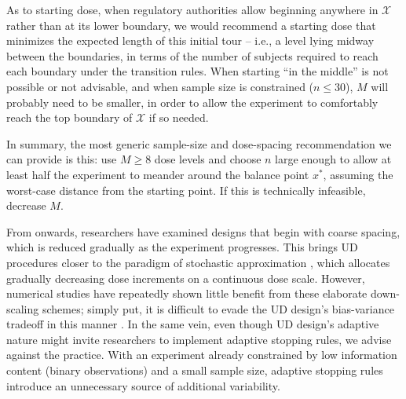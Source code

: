 As to starting dose, when regulatory authorities allow beginning anywhere in $\mathcal{X}$ rather than at its lower boundary, we would recommend a starting dose that minimizes the expected length of this initial tour -- i.e., a level lying midway between the boundaries, in terms of the number of subjects required to reach each boundary under the transition rules. When starting ``in the middle'' is not possible or not advisable, and when sample size is constrained ($n\leq 30$), $M$ will probably need to be smaller, in order to allow the experiment to comfortably reach the top boundary of $\mathcal{X}$ if so needed.

In summary, the most generic sample-size and dose-spacing recommendation we can provide is this: use $M\geq 8$ dose levels and choose $n$ large enough to allow at least half the experiment to meander around the balance point $x^*$, assuming the worst-case distance from the starting point. If this is technically infeasible, decrease $M$.

From \cite{Weth:Sequ:1963} onwards, researchers have examined designs that begin with coarse spacing, which is reduced  gradually as the experiment progresses. This brings UD procedures closer to the paradigm of stochastic approximation \citep{Robb:Monro:Asto:1951}, which allocates gradually decreasing dose increments on a continuous dose scale. However, numerical studies have repeatedly shown little benefit from these elaborate down-scaling schemes; simply put, it is difficult to evade the UD design's bias-variance tradeoff in this manner \citep{Garc:Pere:Forc:1998}. In the same vein, even though UD design's adaptive nature might invite researchers to implement adaptive stopping rules, we  advise against the practice. With an experiment already constrained by low information content (binary observations) and a small sample size, adaptive stopping rules introduce an unnecessary source of additional variability.

